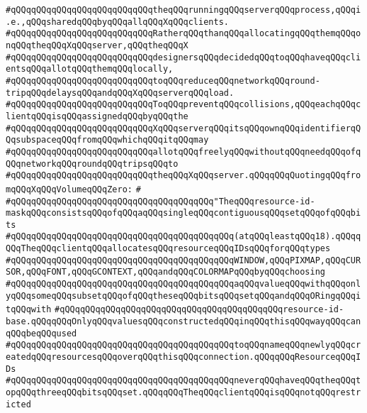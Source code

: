\verb|#qQQqqQQqqQQqqQQqqQQqqQQqqQQqtheqQQqrunningqQQqserverqQQqprocess,qQQqi.e.,qQQqsharedqQQqbyqQQqallqQQqXqQQqclients.|\newline
\verb|#qQQqqQQqqQQqqQQqqQQqqQQqqQQqRatherqQQqthanqQQqallocatingqQQqthemqQQqonqQQqtheqQQqXqQQqserver,qQQqtheqQQqX|\newline
\verb|#qQQqqQQqqQQqqQQqqQQqqQQqqQQqdesignersqQQqdecidedqQQqtoqQQqhaveqQQqclientsqQQqallotqQQqthemqQQqlocally,|\newline
\verb|#qQQqqQQqqQQqqQQqqQQqqQQqqQQqtoqQQqreduceqQQqnetworkqQQqround-tripqQQqdelaysqQQqandqQQqXqQQqserverqQQqload.|\newline
\verb|#qQQqqQQqqQQqqQQqqQQqqQQqqQQqToqQQqpreventqQQqcollisions,qQQqeachqQQqclientqQQqisqQQqassignedqQQqbyqQQqthe|\newline
\verb|#qQQqqQQqqQQqqQQqqQQqqQQqqQQqXqQQqserverqQQqitsqQQqownqQQqidentifierqQQqsubspaceqQQqfromqQQqwhichqQQqitqQQqmay|\newline
\verb|#qQQqqQQqqQQqqQQqqQQqqQQqqQQqallotqQQqfreelyqQQqwithoutqQQqneedqQQqofqQQqnetworkqQQqroundqQQqtripsqQQqto|\newline
\verb|#qQQqqQQqqQQqqQQqqQQqqQQqqQQqtheqQQqXqQQqserver.qQQqqQQqQuotingqQQqfromqQQqXqQQqVolumeqQQqZero:|\newline
\verb|#|\newline
\verb|#qQQqqQQqqQQqqQQqqQQqqQQqqQQqqQQqqQQqqQQq"TheqQQqresource-id-maskqQQqconsistsqQQqofqQQqaqQQqsingleqQQqcontiguousqQQqsetqQQqofqQQqbits|\newline
\verb|#qQQqqQQqqQQqqQQqqQQqqQQqqQQqqQQqqQQqqQQqqQQq(atqQQqleastqQQq18).qQQqqQQqTheqQQqclientqQQqallocatesqQQqresourceqQQqIDsqQQqforqQQqtypes|\newline
\verb|#qQQqqQQqqQQqqQQqqQQqqQQqqQQqqQQqqQQqqQQqqQQqWINDOW,qQQqPIXMAP,qQQqCURSOR,qQQqFONT,qQQqGCONTEXT,qQQqandqQQqCOLORMAPqQQqbyqQQqchoosing|\newline
\verb|#qQQqqQQqqQQqqQQqqQQqqQQqqQQqqQQqqQQqqQQqqQQqaqQQqvalueqQQqwithqQQqonlyqQQqsomeqQQqsubsetqQQqofqQQqtheseqQQqbitsqQQqsetqQQqandqQQqORingqQQqitqQQqwith|\newline
\verb|#qQQqqQQqqQQqqQQqqQQqqQQqqQQqqQQqqQQqqQQqqQQqresource-id-base.qQQqqQQqOnlyqQQqvaluesqQQqconstructedqQQqinqQQqthisqQQqwayqQQqcanqQQqbeqQQqused|\newline
\verb|#qQQqqQQqqQQqqQQqqQQqqQQqqQQqqQQqqQQqqQQqqQQqtoqQQqnameqQQqnewlyqQQqcreatedqQQqresourcesqQQqoverqQQqthisqQQqconnection.qQQqqQQqResourceqQQqIDs|\newline
\verb|#qQQqqQQqqQQqqQQqqQQqqQQqqQQqqQQqqQQqqQQqqQQqneverqQQqhaveqQQqtheqQQqtopqQQqthreeqQQqbitsqQQqset.qQQqqQQqTheqQQqclientqQQqisqQQqnotqQQqrestricted|\newline
